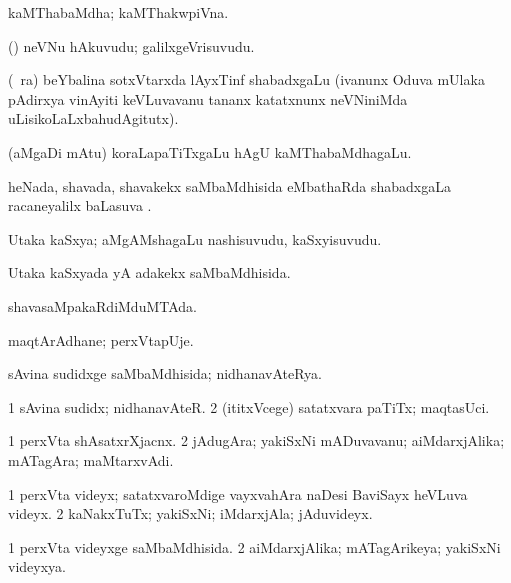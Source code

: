 \bentry
{}
\gl{\nA}
\bmng
kaMThabaMdha; kaMThakwpiVna. 
\emng
\eentry

\bentry
{}
\gl{\nA}
\bmng
(\ashi) neVNu hAkuvudu; galilxgeVrisuvudu. 
\emng
\eentry

\bentry
{}
\gl{\nA}
\bmng
(\kanmu\ ra) beYbalina sotxVtarxda lAyxTinf shabadxgaLu (ivanunx Oduva mUlaka pAdirxya vinAyiti keVLuvavanu tananx katatxnunx neVNiniMda uLisikoLaLxbahudAgitutx). 
\emng
\eentry

\bentry
{}
\gl{\nA}
\bmng
(aMgaDi mAtu) koraLapaTiTxgaLu hAgU kaMThabaMdhagaLu. 
\emng
\eentry

\bentry
{}
\gl{\sapUpa}
\bmng
heNada, shavada, shavakekx saMbaMdhisida eMbathaRda shabadxgaLa racaneyalilx baLasuva \sapUpa. 
\emng
\eentry

\bentry
{}
\gl{\nA}
\bmng
Utaka kaSxya; aMgAMshagaLu nashisuvudu, kaSxyisuvudu. 
\emng
\eentry

\bentry
{}
\gl{\gu}
\bmng
Utaka kaSxyada yA adakekx saMbaMdhisida. 
\emng
\eentry

\bentry
{}
\gl{\gu}
\bmng
shavasaMpakaRdiMduMTAda. 
\emng
\eentry

\bentry
{}
\gl{\nA}
\bmng
maqtArAdhane; perxVtapUje. 
\emng
\eentry

\bentry
{}
\gl{\gu}
\bmng
sAvina sudidxge saMbaMdhisida; nidhanavAteRya. 
\emng
\eentry

\bentry
{}
\gl{\nA}
\bmng
\bnum
\num{1} sAvina sudidx; nidhanavAteR. 
\num{2} (ititxVcege) satatxvara paTiTx; maqtasUci. 
\enum
\emng
\eentry

\bentry
{}
\gl{\nA}
\bmng
\bnum
\num{1} perxVta shAsatxrXjacnx. 
\num{2} jAdugAra; yakiSxNi mADuvavanu; aiMdarxjAlika; mATagAra; maMtarxvAdi. 
\enum
\emng
\eentry

\bentry
{}
\gl{\nA}
\bmng
\bnum
\num{1} perxVta videyx; satatxvaroMdige vayxvahAra naDesi BaviSayx heVLuva videyx. 
\num{2} kaNakxTuTx; yakiSxNi; iMdarxjAla; jAduvideyx. 
\enum
\emng
\eentry

\bentry
{}
\gl{\gu}
\bmng
\bnum
\num{1} perxVta videyxge saMbaMdhisida. 
\num{2} aiMdarxjAlika; mATagArikeya; yakiSxNi videyxya. 
\enum
\emng
\eentry


